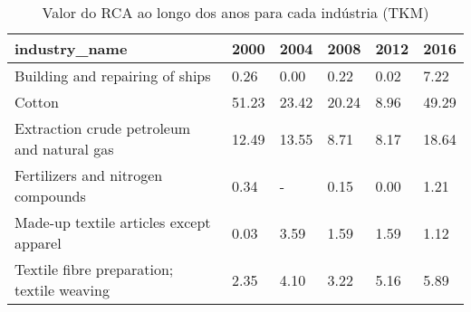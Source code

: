 \begin{table}
\centering
\caption{Valor do RCA ao longo dos anos para cada indústria (TKM)}
\begin{tabular}{p{6cm}p{1.5cm}p{1.5cm}p{1.5cm}p{1.5cm}p{1.5cm}}
\toprule
                             industry\_name &  2000 &  2004 &  2008 & 2012 &  2016 \\
\midrule
           Building and repairing of ships &  0.26 &  0.00 &  0.22 & 0.02 &  7.22 \\
                                    Cotton & 51.23 & 23.42 & 20.24 & 8.96 & 49.29 \\
Extraction crude petroleum and natural gas & 12.49 & 13.55 &  8.71 & 8.17 & 18.64 \\
        Fertilizers and nitrogen compounds &  0.34 &     - &  0.15 & 0.00 &  1.21 \\
   Made-up textile articles except apparel &  0.03 &  3.59 &  1.59 & 1.59 &  1.12 \\
Textile fibre preparation; textile weaving &  2.35 &  4.10 &  3.22 & 5.16 &  5.89 \\
\bottomrule
\end{tabular}
\end{table}
